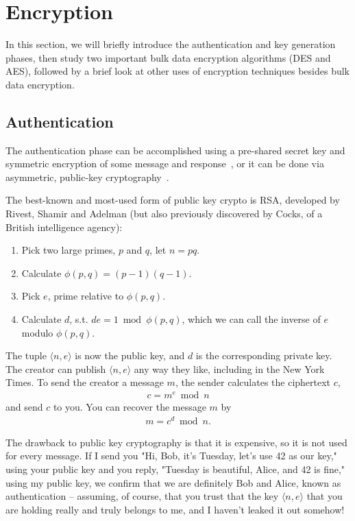 \section{Encryption}

In this section, we will briefly introduce the authentication and key
generation phases, then study two important bulk data encryption
algorithms (DES and AES), followed by a brief look at other uses of
encryption techniques besides bulk data encryption.

\subsection{Authentication}

The authentication phase can be accomplished using a pre-shared secret
key and symmetric encryption of some message and
response~\cite{needham:encrypt}, or it can be done via
asymmetric, public-key cryptography~\cite{rivest78:_rsa}.

The best-known and most-used form of public key crypto is RSA, developed by Rivest, Shamir and Adelman (but also previously discovered by Cocks, of a British intelligence agency):

\begin{enumerate}
\item Pick two large primes, $p$ and $q$, let $n = pq$.
\item Calculate $\phi(p,q) = (p-1)(q-1)$.
\item Pick $e$, prime relative to $\phi(p,q)$.
\item Calculate $d$, s.t. $de = 1 \bmod \phi(p,q)$,
  which we can call the inverse of $e$ modulo $\phi(p,q)$.
\end{enumerate}

The tuple $\langle n,e\rangle$ is now the public key, and $d$ is the
corresponding private key.  The creator can publish $\langle n,e\rangle$ any
way they like, including in the New York Times. To send the creator a message
$m$, the sender calculates the ciphertext $c$,
\begin{align}
c = m^e \bmod n
\end{align}
and send $c$ to you.  You can recover the message $m$ by
\begin{align}
m = c^d \bmod n.
\end{align}

The drawback to public key cryptography is that it is expensive, so it
is not used for every message.  If I send you "Hi, Bob, it's Tuesday,
let's use 42 as our key," using your public key and you reply,
"Tuesday is beautiful, Alice, and 42 is fine," using my public key, we
confirm that we are definitely Bob and Alice, known as authentication
-- assuming, of course, that you trust that the key $\langle
n,e\rangle$ that you are holding really and truly belongs to me, and I
haven't leaked it out somehow!

